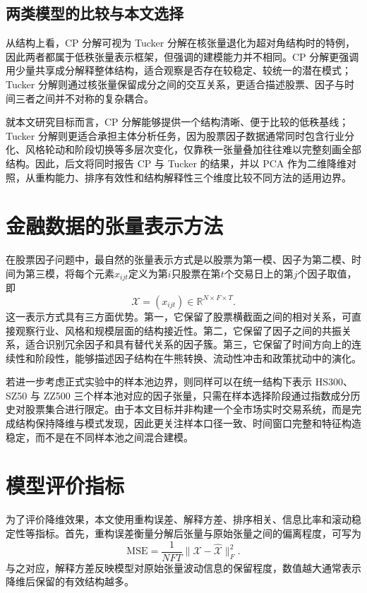 \subsection{两类模型的比较与本文选择}

从结构上看，CP 分解可视为 Tucker 分解在核张量退化为超对角结构时的特例，因此两者都属于低秩张量表示框架，但强调的建模能力并不相同。CP 分解更强调用少量共享成分解释整体结构，适合观察是否存在较稳定、较统一的潜在模式；Tucker 分解则通过核张量保留成分之间的交互关系，更适合描述股票、因子与时间三者之间并不对称的复杂耦合。

就本文研究目标而言，CP 分解能够提供一个结构清晰、便于比较的低秩基线；Tucker 分解则更适合承担主体分析任务，因为股票因子数据通常同时包含行业分化、风格轮动和阶段切换等多层次变化，仅靠秩一张量叠加往往难以完整刻画全部结构。因此，后文将同时报告 CP 与 Tucker 的结果，并以 PCA 作为二维降维对照，从重构能力、排序有效性和结构解释性三个维度比较不同方法的适用边界。

\section{金融数据的张量表示方法}

在股票因子问题中，最自然的张量表示方式是以股票为第一模、因子为第二模、时间为第三模，将每个元素$x_{ijt}$定义为第$i$只股票在第$t$个交易日上的第$j$个因子取值，即
\begin{equation}
\mathcal{X}=(x_{ijt})\in\mathbb{R}^{N\times F\times T}.
\end{equation}
这一表示方式具有三方面优势。第一，它保留了股票横截面之间的相对关系，可直接观察行业、风格和规模层面的结构接近性。第二，它保留了因子之间的共振关系，适合识别冗余因子和具有替代关系的因子簇。第三，它保留了时间方向上的连续性和阶段性，能够描述因子结构在牛熊转换、流动性冲击和政策扰动中的演化。

若进一步考虑正式实验中的样本池边界，则同样可以在统一结构下表示 HS300、SZ50 与 ZZ500 三个样本池对应的因子张量，只需在样本选择阶段通过指数成分历史对股票集合进行限定。由于本文目标并非构建一个全市场实时交易系统，而是完成结构保持降维与模式发现，因此更关注样本口径一致、时间窗口完整和特征构造稳定，而不是在不同样本池之间混合建模。

\section{模型评价指标}

为了评价降维效果，本文使用重构误差、解释方差、排序相关、信息比率和滚动稳定性等指标。首先，重构误差衡量分解后张量与原始张量之间的偏离程度，可写为
\begin{equation}
\mathrm{MSE}=\frac{1}{NFT}\|\mathcal{X}-\hat{\mathcal{X}}\|_F^2.
\end{equation}
与之对应，解释方差反映模型对原始张量波动信息的保留程度，数值越大通常表示降维后保留的有效结构越多。


